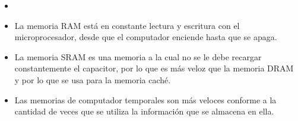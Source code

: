 \documentclass{article}
\begin{document}
\begin{itemize}
            
        \item
            
            
        \item
            La memoria RAM está en constante lectura y escritura con el microprocesador, desde que el computador enciende hasta que se apaga.
        
            
        \item
            La memoria SRAM es una memoria a la cual no se le debe recargar constantemente el capacitor, por lo que es más veloz que la memoria DRAM y por lo que se usa para la memoria caché.
            
            
        \item
            Las memorias de computador temporales son más veloces conforme a la cantidad de veces que se utiliza la información que se almacena en ella. 
   
        
    \end{itemize}







\cite{referencia}
\end{document}
